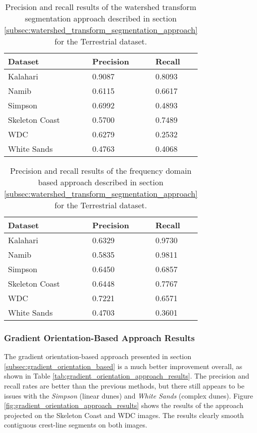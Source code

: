 \begin{table}
	\centering
	\caption{Precision and recall results of the watershed transform segmentation approach described in section \ref{subsec:watershed_transform_segmentation_approach} for the Terrestrial dataset.}
	\label{tab:watershed_segmentation_results}
	\begin{tabu} to 0.6\textwidth { | X[2,c] || X[1,c] | X[1,c] | }
		\hline
		\textbf{Dataset} & \textbf{Precision} & \textbf{Recall} \\
		\hline\hline
		Kalahari & 0.9087 & 0.8093 \\
		Namib & 0.6115 & 0.6617 \\
		Simpson & 0.6992 & 0.4893 \\
		Skeleton Coast & 0.5700 & 0.7489 \\
		WDC & 0.6279 & 0.2532 \\
		White Sands & 0.4763 & 0.4068 \\
		\hline
	\end{tabu}
\end{table}

\begin{table}
	\centering
	\caption{Precision and recall results of the frequency domain based approach described in section \ref{subsec:watershed_transform_segmentation_approach} for the Terrestrial dataset.}
	\label{tab:frequency_domain_approach_results}
	\begin{tabu} to 0.6\textwidth { | X[2,c] || X[1,c] | X[1,c] | }
		\hline
		\textbf{Dataset} & \textbf{Precision} & \textbf{Recall} \\
		\hline\hline
		Kalahari & 0.6329 & 0.9730 \\
		Namib & 0.5835 & 0.9811 \\
		Simpson & 0.6450 & 0.6857 \\
		Skeleton Coast & 0.6448 & 0.7767 \\
		WDC & 0.7221 & 0.6571 \\
		White Sands & 0.4703 & 0.3601 \\
		\hline
	\end{tabu}
\end{table}

\subsubsection*{Gradient Orientation-Based Approach Results}

The gradient orientation-based approach presented in section \ref{subsec:gradient_orientation_based} is a much better improvement overall, as shown in Table \ref{tab:gradient_orientation_approach_results}. The precision and recall rates are better than the previous methods, but there still appears to be issues with the \emph{Simpson} (linear dunes) and \emph{White Sands} (complex dunes). Figure \ref{fig:gradient_orientation_approach_results} shows the results of the approach projected on the Skeleton Coast and WDC images. The results clearly smooth contiguous crest-line segments on both images.

